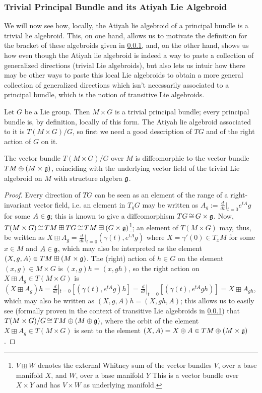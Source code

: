 \subsubsection{Trivial Principal Bundle and its Atiyah Lie Algebroid}

We will now see how, locally, the Atiyah lie algebroid of a principal bundle is a trivial lie algebroid. This, on one hand, allows us to motivate the definition for the bracket of these algebroids given in \ref{}, and, on the other hand, shows us how even though the Atiyah lie algebroid is indeed a way to paste a collection of generalized directions (trivial Lie algebroids), but also lets us intuir how there may be other ways to paste this local Lie algebroids to obtain a more general collection of generalized directions which isn't necessarily associated to a principal bundle, which is the notion of transitive Lie algebroids.

Let $G$ be a Lie group. Then $M \times G$ is a trivial principal bundle; every principal bundle is, by definition, locally of this form. The Atiyah lie algebroid associated to it is $T(M \times G)/G$, so first we need a good description of $TG$ and of the right action of $G$ on it. 

\begin{proposition}
The vector bundle $T(M \times G)/G$ over $M$ is diffeomorphic to the vector bundle $TM \oplus (M \times \mathfrak{g})$, coinciding with the underlying vector field of the trivial Lie algebroid on $M$ with structure algebra $\mathfrak{g}$.
\end{proposition}

\begin{proof}
Every direction of $TG$ can be seen as an element of the range of a right-invariant vector field, i.e. an element in $T_g G$ may be written as $A_g :=\frac{d}{dt}|_{t=0}e^{tA}g$ for some $A \in \mathfrak{g}$; this is known to give a diffeomorphism $TG \operatorname{\cong} G \times \mathfrak{g}$. Now, $T(M \times G) \operatorname{\cong} TM \boxplus TG \operatorname{\cong} TM \boxplus (G \times \mathfrak{g})$\footnote{$V \boxplus W$ denotes the external Whitney sum of the vector bundles $V$, over a base manifold $X$, and $W$, over a base manifold $Y$ This is a vector bundle over $X \times Y$ and has $V \times W$ as underlying manifold.}; an element of $T(M \times G)$ may, thus, be written as $X \boxplus A_g = \frac{d}{dt}|_{t = 0}(\gamma(t), e^{tA}g)$ where $X = \gamma'(0) \in T_x M$ for some $x \in M$ and $A \in \mathfrak{g}$, which may also be interpreted as the element $(X, g, A) \in TM \boxplus (M \times \mathfrak{g})$. The (right) action of $h \in G$ on the element $(x, g) \in M\times G$ is $(x, g)h = (x, gh)$, so the right action on $X \boxplus A_g \in T(M \times G)$ is $(X \boxplus A_g)h = \frac{d}{dt}|_{t=0}[(\gamma(t), e^{tA}g)h] = \frac{d}{dt}|_{t=0}[(\gamma(t), e^{tA}gh)] = X \boxplus A_{gh}$, which may also be written as $(X, g, A)h = (X, gh, A)$; this allows us to easily see (formally proven in the context of transitive Lie algebroids in \ref{}) that $T(M \times G)/G \operatorname{\cong} TM \oplus (M \oplus \mathfrak{g})$, where the orbit of the element $X \boxplus A_g \in T(M \times G)$ is sent to the element $(X, A) = X \oplus A \in TM \oplus (M \times \mathfrak{g})$.
\end{proof}

